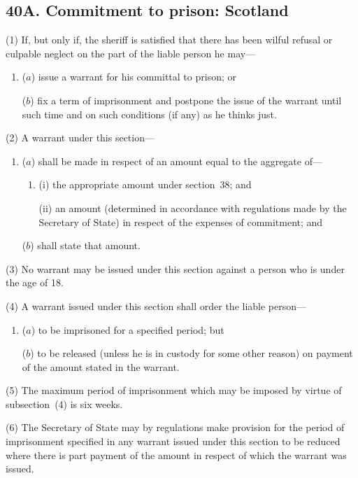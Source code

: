 \documentclass[12pt,a4paper]{article}
\begin{document}
\subsection{40A. Commitment to prison: Scotland}

(1) If, but only if, the sheriff is satisfied that there has been wilful refusal or culpable neglect on the part of the liable person he may—
\begin{enumerate}\item[]
($a$) issue a warrant for his committal to prison; or

($b$) fix a term of imprisonment and postpone the issue of the warrant until such time and on such conditions (if any) as he thinks just.
\end{enumerate}

(2) A warrant under this section—
\begin{enumerate}\item[]
($a$) shall be made in respect of an amount equal to the aggregate of—
\begin{enumerate}\item[]
(i) the appropriate amount under section~38; and

(ii) an amount (determined in accordance with regulations made by the Secretary of State) in respect of the expenses of commitment; and
\end{enumerate}

($b$) shall state that amount.
\end{enumerate}

(3) No warrant may be issued under this section against a person who is under the age of 18. 

(4) A warrant issued under this section shall order the liable person—
\begin{enumerate}\item[]
($a$) to be imprisoned for a specified period; but

($b$) to be released (unless he is in custody for some other reason) on payment of the amount stated in the warrant.
\end{enumerate}

(5) The maximum period of imprisonment which may be imposed by virtue of subsection~(4)  is six weeks.

(6) The Secretary of State may by regulations make provision for the period of imprisonment specified in any warrant issued under this section to be reduced where there is part payment of the amount in respect of which the warrant was issued.
\end{document}
